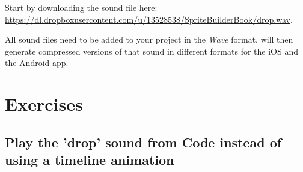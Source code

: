 Start by downloading the sound file here:
\url{https://dl.dropboxusercontent.com/u/13528538/SpriteBuilderBook/drop.wav}.

All sound files need to be added to your \SB{} project in the \textit{Wave}
format. \SB{} will then generate compressed versions of that sound in different
formats for the iOS and the Android app.

\section{Exercises}
\subsection{Play the 'drop' sound from Code instead of using a timeline
animation}
